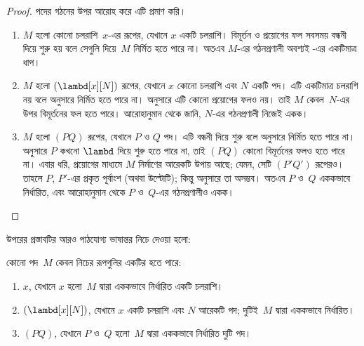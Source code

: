 \documentclass[../../../include/open-logic-section]{subfiles}
\begin{document}
\begin{proof}
  পদের গঠনের উপর আরোহ করে এটি প্রমাণ করি।
  \begin{enumerate}
    \item $M$ হলো কোনো চলরাশি~$x$-এর রূপের, যেখানে $x$ একটি চলরাশি। বিমূর্তন ও প্রয়োগের ফল
      সবসময় বন্ধনী দিয়ে শুরু হয় বলে সেগুলি দিয়ে~$M$ নির্মিত হতে পারে
      না। অতএব $M$-এর গঠনপ্রণালী অবশ্যই
      -এর একটিমাত্র ধাপ।
    \item $M$ হলো $(\lambd[x][N])$ রূপের, যেখানে $x$ কোনো চলরাশি এবং
      $N$ একটি পদ। এটি একটিমাত্র চলরাশি নয় বলে
       অনুসারে নির্মিত হতে
      পারে না।  অনুসারে এটি কোনো প্রয়োগের ফলও নয়।
      তাই $M$ কেবল~$N$-এর উপর বিমূর্তনের ফল হতে পারে। আরোহানুমান থেকে
      জানি, $N$-এর গঠনপ্রণালী নিজেই একক।
    \item $M$ হলো $(PQ)$ রূপের, যেখানে $P$ ও $Q$ পদ। এটি বন্ধনী দিয়ে
      শুরু বলে  অনুসারে
      নির্মিত হতে পারে না।  অনুসারে $P$ কখনো
      $\lambd$ দিয়ে শুরু হতে পারে না, তাই $(PQ)$ কোনো বিমূর্তনের ফলও হতে
      পারে না। এবার ধরি, প্রয়োগের মাধ্যমে $M$ নির্মাণের আরেকটি উপায় আছে;
      যেমন, সেটি $(P'Q')$ রূপেরও। তাহলে $P$, $P'$-এর প্রকৃত পূর্বাংশ
      (অথবা উল্টোটি); কিন্তু  অনুসারে তা অসম্ভব। অতএব
      $P$ ও~$Q$ এককভাবে নির্ধারিত, এবং আরোহানুমান থেকে $P$ ও~$Q$-এর
      গঠনপ্রণালীও একক।
  \end{enumerate}
\end{proof}

উপরের প্রস্তাবটির আরও পাঠযোগ্য ভাষান্তর নিচে দেওয়া হলো:
\begin{prop}
  কোনো পদ~$M$ কেবল নিচের রূপগুলির একটির হতে পারে:
  \begin{enumerate}
    \item $x$, যেখানে $x$ হলো~$M$ দ্বারা এককভাবে নির্ধারিত একটি চলরাশি।
    \item $(\lambd[x][N])$, যেখানে $x$ একটি চলরাশি এবং $N$ আরেকটি পদ;
      দুটিই~$M$ দ্বারা এককভাবে নির্ধারিত।
    \item $(PQ)$, যেখানে $P$ ও~$Q$ হলো~$M$ দ্বারা এককভাবে নির্ধারিত দুটি
      পদ।
  \end{enumerate}
\end{prop}
\end{document}

